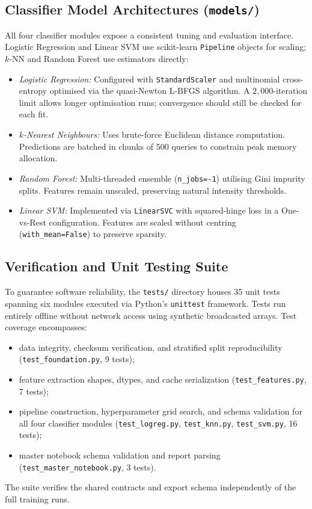 \documentclass[conference]{IEEEtran}
\newcommand{\code}[1]{\texttt{#1}}
\newcommand{\file}[1]{\texttt{#1}}
\begin{document}
\subsection{Classifier Model Architectures (\file{models/})}
All four classifier modules expose a consistent tuning and evaluation
interface. Logistic Regression and Linear SVM use scikit-learn
\code{Pipeline} objects for scaling; $k$-NN and Random Forest use
estimators directly:
\begin{itemize}
  \item \emph{Logistic Regression:} Configured with \code{StandardScaler}
    and multinomial cross-entropy optimised via the quasi-Newton L-BFGS
    algorithm. A $2{,}000$-iteration limit allows longer optimisation runs;
    convergence should still be checked for each fit.
  \item \emph{$k$-Nearest Neighbours:} Uses brute-force Euclidean distance
    computation. Predictions are batched in chunks of $500$ queries to
    constrain peak memory allocation.
  \item \emph{Random Forest:} Multi-threaded ensemble (\code{n\_jobs=-1})
    utilising Gini impurity splits. Features remain unscaled, preserving
    natural intensity thresholds.
  \item \emph{Linear SVM:} Implemented via \code{LinearSVC} with squared-hinge
    loss in a One-vs-Rest configuration. Features are scaled without
    centring (\code{with\_mean=False}) to preserve sparsity.
\end{itemize}

\subsection{Verification and Unit Testing Suite}
To guarantee software reliability, the \file{tests/} directory houses 35
unit tests spanning six modules executed via Python's \code{unittest}
framework. Tests run entirely offline without network access using
synthetic broadcasted arrays. Test coverage encompasses:
\begin{itemize}
  \item data integrity, checksum verification, and stratified split
    reproducibility (\file{test\_foundation.py}, 9 tests);
  \item feature extraction shapes, dtypes, and cache serialization
    (\file{test\_features.py}, 7 tests);
  \item pipeline construction, hyperparameter grid search, and schema
    validation for all four classifier modules (\file{test\_logreg.py},
    \file{test\_knn.py}, \file{test\_svm.py}, 16 tests);
  \item master notebook schema validation and report parsing
    (\file{test\_master\_notebook.py}, 3 tests).
\end{itemize}
The suite verifies the shared contracts and export schema independently
of the full training runs.
\end{document}
